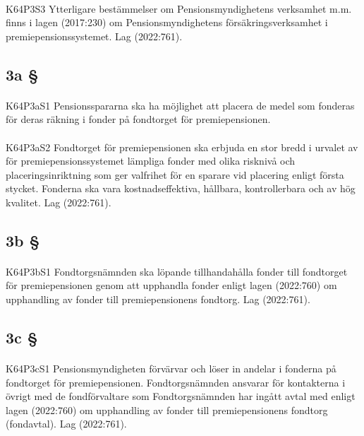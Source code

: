 \documentclass[a4paper,notitlepage,openany,10pt]{book}
\begin{document}
\paragraph*{}
{\tiny K64P3S3}
Ytterligare bestämmelser om Pensionsmyndighetens verksamhet m.m. finns i lagen (2017:230) om Pensionsmyndighetens försäkringsverksamhet i premiepensionssystemet.
Lag (2022:761).
\subsection*{3a §}
\paragraph*{}
{\tiny K64P3aS1}
Pensionsspararna ska ha möjlighet att placera de medel som fonderas för deras räkning i fonder på fondtorget för premiepensionen.
\paragraph*{}
{\tiny K64P3aS2}
Fondtorget för premiepensionen ska erbjuda en stor bredd i urvalet av för premiepensionssystemet lämpliga fonder med olika risknivå och placeringsinriktning som ger valfrihet för en sparare vid placering enligt första stycket. Fonderna ska vara kostnadseffektiva, hållbara, kontrollerbara och av hög kvalitet.
Lag (2022:761).
\subsection*{3b §}
\paragraph*{}
{\tiny K64P3bS1}
Fondtorgsnämnden ska löpande tillhandahålla fonder till fondtorget för premiepensionen genom att upphandla fonder enligt lagen (2022:760) om upphandling av fonder till premiepensionens fondtorg.
Lag (2022:761).
\subsection*{3c §}
\paragraph*{}
{\tiny K64P3cS1}
Pensionsmyndigheten förvärvar och löser in andelar i fonderna på fondtorget för premiepensionen. Fondtorgsnämnden ansvarar för kontakterna i övrigt med de fondförvaltare som Fondtorgsnämnden har ingått avtal med enligt lagen (2022:760) om upphandling av fonder till premiepensionens fondtorg (fondavtal).
Lag (2022:761).
\end{document}
